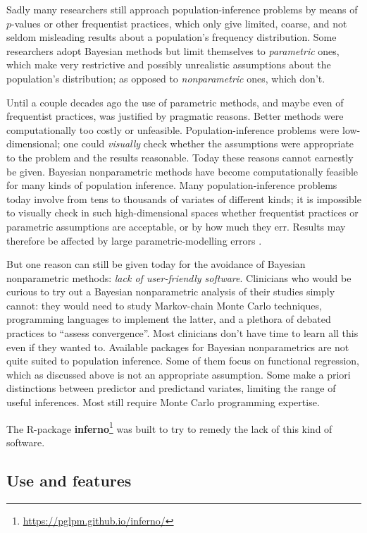 Sadly many researchers still approach population-inference problems by means of $p$-values or other frequentist practices, which only give limited, coarse, and not seldom misleading results about a population's frequency distribution. Some researchers adopt Bayesian methods but limit themselves to \emph{parametric} ones, which make very restrictive and possibly unrealistic assumptions about the population's distribution; as opposed to \emph{nonparametric} ones, which don't.

Until a couple decades ago the use of parametric methods, and maybe even of frequentist practices, was justified by pragmatic reasons. Better methods were computationally too costly or unfeasible. Population-inference problems were low-dimensional; one could \emph{visually} check whether the assumptions were appropriate to the problem and the results reasonable. Today these reasons cannot earnestly be given. Bayesian nonparametric methods have become computationally feasible for many kinds of population inference. Many population-inference problems today involve from tens to thousands of variates of different kinds; it is impossible to visually check in such high-dimensional spaces whether frequentist practices or parametric assumptions are acceptable, or by how much they err. Results may therefore be affected by large parametric-modelling errors \citep{draper1995}.

But one reason can still be given today for the avoidance of Bayesian nonparametric methods: \emph{lack of user-friendly software}. Clinicians who would be curious to try out a Bayesian nonparametric analysis of their studies simply cannot: they would need to study Markov-chain Monte Carlo techniques, programming languages to implement the latter, and a plethora of debated practices to ``assess convergence''. Most clinicians don't have time to learn all this even if they wanted to. Available packages for Bayesian nonparametrics are not quite suited to population inference. Some of them focus on functional regression, which as discussed above is not an appropriate assumption. Some make a priori distinctions between predictor and predictand variates, limiting the range of useful inferences. Most still require Monte Carlo programming expertise.

\medskip

The R-package \textbf{inferno}\footnote{\url{https://pglpm.github.io/inferno/}} was built to try to remedy the lack of this kind of software.

\subsection*{Use and features}
\label{sec:features}

